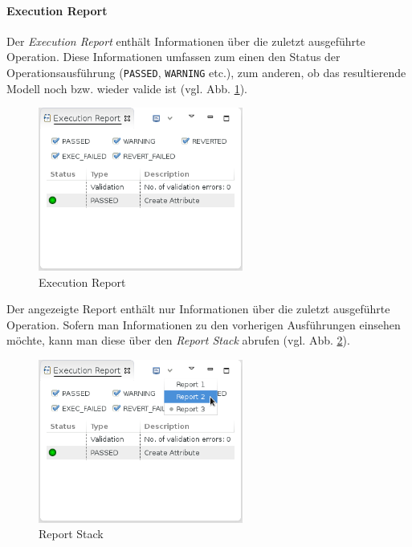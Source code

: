 \paragraph{Execution Report}
Der \textit{Execution Report} enthält Informationen über die zuletzt ausgeführte Operation. Diese Informationen umfassen zum einen den Status der Operationsausführung (\texttt{PASSED}, \texttt{WARNING} etc.), zum anderen, ob das resultierende Modell noch bzw. wieder valide ist (vgl. Abb. \ref{silift-tutorial_patching_execution_report}).

\begin{figure}[H]
\centering
\includegraphics[width=0.6\textwidth]{patching/graphics/silift-tutorial_patching_execution_report.png}
\caption{Execution Report}
\label{silift-tutorial_patching_execution_report}
\end{figure}

Der angezeigte Report enthält nur Informationen über die zuletzt ausgeführte Operation. Sofern man Informationen zu den vorherigen Ausführungen einsehen möchte, kann man diese über den \textit{Report Stack} abrufen (vgl. Abb. \ref{silift-tutorial_patching_execution_report_stack}).

\begin{figure}[H]
\centering
\includegraphics[width=0.6\textwidth]{patching/graphics/silift-tutorial_patching_execution_report_stack.png}
\caption{Report Stack}
\label{silift-tutorial_patching_execution_report_stack}
\end{figure}